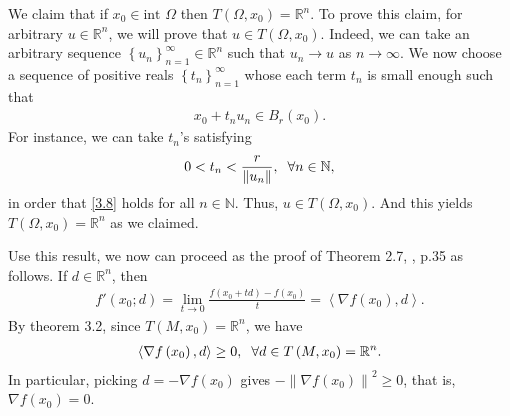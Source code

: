 \documentclass[a4paper]{article}
\numberwithin{equation}{section}
\begin{document}
We claim that if $x_0\in \mbox{int }\Omega$ then $T\left(\Omega,x_0\right)=\mathbb{R}^n$. To prove this claim, for arbitrary $u\in \mathbb{R}^n$, we will prove that $u\in T\left(\Omega,x_0\right)$. Indeed, we can take an arbitrary sequence $\left\{ {{u_n}} \right\}_{n = 1}^\infty \in \mathbb{R}^n$ such that $u_n\to u$ as $n\to \infty$. We now choose a sequence of positive reals $\left\{ {{t_n}} \right\}_{n = 1}^\infty $ whose each term $t_n$ is small enough such that
\begin{align}
\label{3.8}
{x_0} + {t_n}{u_n} \in {B_r}\left( {{x_0}} \right).
\end{align}
For instance, we can take $t_n$'s satisfying
\begin{align}
0 < {t_n} < \frac{r}{{\left\| {{u_n}} \right\|}},\hspace{0.2cm}\forall n \in \mathbb{N},
\end{align}
in order that \eqref{3.8} holds for all $n\in \mathbb{N}$. Thus, $u\in T\left(\Omega,x_0\right)$. And this yields $T\left(\Omega,x_0\right)=\mathbb{R}^n$ as we claimed. 

Use this result, we now can proceed as the proof of Theorem 2.7, \cite{1}, p.35 as follows. If $d\in \mathbb{R}^n$, then
\begin{align}
f'\left( {{x_0};d} \right) = \mathop {\lim }\limits_{t \to 0} \frac{{f\left( {{x_0} + td} \right) - f\left( {{x_0}} \right)}}{t} = \left\langle {\nabla f\left( {{x_0}} \right),d} \right\rangle .
\end{align}
By theorem 3.2, since $T\left(M,x_0\right)=\mathbb{R}^n$, we have 
\begin{align}
\left\langle {\nabla f\left( {{x_0}} \right),d} \right\rangle  \ge 0,\hspace{0.2cm}\forall d \in T\left( {M,{x_0}} \right) = {\mathbb{R}^n}.
\end{align}
In particular, picking $d =  - \nabla f\left( {{x_0}} \right)$ gives $ - {\left\| {\nabla f\left( {{x_0}} \right)} \right\|^2} \ge 0$, that is, $\nabla f\left( {{x_0}} \right) = 0$.
\end{document}
